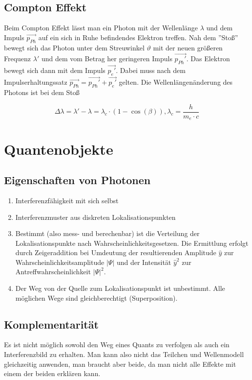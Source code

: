 \documentclass[a4paper]{article}
\begin{document}
								
			
		\subsection{Compton Effekt}
			Beim Compton Effekt lässt man ein Photon mit der Wellenlänge $\lambda$ und dem Impuls $\vec{p_{Ph}}$ auf ein sich in Ruhe befindendes Elektron treffen. Nah dem ''Stoß'' bewegt sich das Photon unter dem Streuwinkel $\vartheta$ mit der neuen größeren Frequenz $\lambda'$ und dem vom Betrag her geringeren Impuls $\vec{p_{Ph}'}$. Das Elektron bewegt sich dann mit dem Impuls $\vec{p_{e}'}$. Dabei muss nach dem Impulserhaltungssatz $\vec{p_{Ph}}=\vec{p_{Ph}'} + \vec{p_{e}'}$ gelten. Die Wellenlängenänderung des Photons ist bei dem Stoß
			
			\begin{equation}
				\Delta\lambda = \lambda'-\lambda = \lambda_c\cdot(1-\cos(\beta)), \lambda_c = \frac{h}{m_e\cdot c}
			\end{equation}
			
	\section{Quantenobjekte}
		\subsection{Eigenschaften von Photonen}
			\begin{enumerate}
				\item Interferenzfähigkeit mit sich selbst
				\item Interferenzmuster aus diskreten Lokalisationspunkten
				\item Bestimmt (also mess- und berechenbar) ist die Verteilung der Lokalisationspunkte nach Wahrscheinlichkeitsgesetzen. Die Ermittlung erfolgt durch Zeigeraddition bei Umdeutung der
				\subitem resultierenden Amplitude $\hat{y}$ zur Wahrscheinlichkeitsamplitude $|\Psi|$ und der
				\subitem Intensität $\hat{y}^2$ zur Antreffwahrscheinlichkeit $|\Psi|^2$.
				\item Der Weg von der Quelle zum Lokalisationspunkt ist unbestimmt. Alle möglichen Wege sind gleichberechtigt (Superposition).
			\end{enumerate}
		\subsection{Komplementarität}
			Es ist nicht möglich sowohl den Weg eines Quants zu verfolgen als auch ein Interferenzbild zu erhalten. Man kann also nicht das Teilchen und Wellenmodell gleichzeitig anwenden, man braucht aber beide, da man nicht alle Effekte mit einem der beiden erklären kann.
\end{document}
